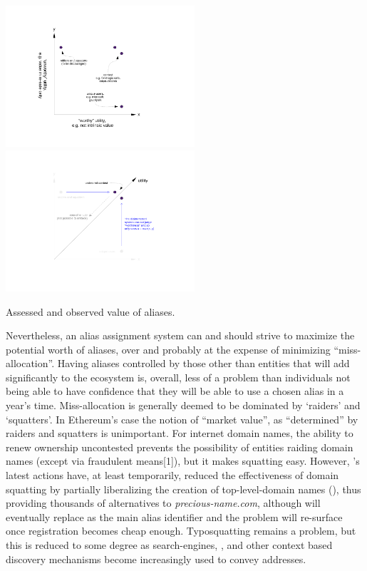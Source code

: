 \documentclass[10pt,a4paper]{article}
\begin{document}
\begin{center}
\includegraphics[trim=4.5cm 2.5cm 5.5cm 3cm, clip, width=7cm]{Diagrams/AliasUtility2D.pdf}
\includegraphics[trim=4.5cm 2.5cm 5.5cm 3cm, clip, width=7cm]{Diagrams/AliasUtility1D.pdf}

{\small Assessed and observed value of aliases.}
\end{center}

Nevertheless, an alias assignment system can and should strive to maximize the potential worth of aliases, over and probably at the expense of minimizing ``miss-allocation''. Having aliases controlled by those other than entities that will add significantly to the ecosystem is, overall, less of a problem than individuals not being able to have confidence that they will be able to use a chosen alias in a year's time. Miss-allocation is generally deemed to be dominated by `raiders' and `squatters'. In Ethereum's case the notion of ``market value'', as ``determined'' by raiders and squatters is unimportant. For internet domain names, the ability to renew ownership uncontested prevents the possibility of entities raiding domain names (except via fraudulent means[1]), but it makes squatting easy. However, \icann's latest actions have, at least temporarily, reduced the effectiveness of domain squatting by partially liberalizing the creation of top-level-domain names (\tlds), thus providing thousands of alternatives to {\it precious-name.com}, although \tlds will eventually replace \slds as the main alias identifier and the problem will re-surface once \tld registration becomes cheap enough. Typosquatting remains a problem, but this is reduced to some degree as search-engines, \qrcodes, \nfc and other context based discovery mechanisms become increasingly used to convey addresses. 
\end{document}
